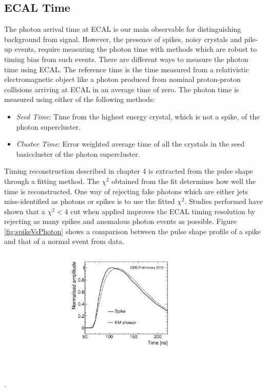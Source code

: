 \subsection{ECAL Time}
The photon arrival time at ECAL is our main observable for distinguishing background from signal.  However, the presence of spikes, noisy crystals and pile-up events, require measuring the photon time with methods which are robust to timing bias from such events.
There are different ways to measure the photon time using ECAL.  The reference time is the time measured from a relativistic electromagnetic object like a photon produced from nominal proton-proton collisions arriving at ECAL in an average time of zero. The photon time is measured using either of the following methods: 
\begin{itemize}
\item \textit{Seed Time}: Time from the highest energy crystal, which is not a spike, of the photon supercluster.
\item \textit{Cluster Time}: Error weighted average time of all the crystals in the seed basiccluster of the photon supercluster.
\end{itemize} 

Timing reconstruction described in chapter 4 is extracted from the pulse shape through a fitting method. The $\chi^{2}$ obtained from the fit determines how well the time is reconstructed. One way of rejecting fake photons which are either jets miss-identified as photons or spikes is to use the fitted $\chi^{2}$. Studies performed have shown that a  $\chi^{2} < 4 $ cut when applied improves the ECAL timing resolution by rejecting as many spikes and anomalous photon events as possible. Figure \ref{fig:spikeVsPhoton} shows a comparison between the pulse shape profile of a spike and that of a normal event from data.

\begin{center}
\centering
\includegraphics[height=6cm, width=0.7\textwidth]{THESISPLOTS/spike_pulse_shape.pdf}
\label{fig:spikeVsPhoton}
\end{center}.

